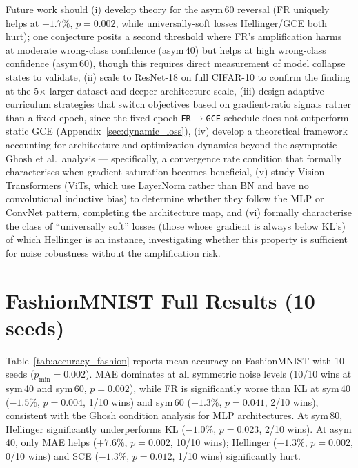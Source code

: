 \documentclass[11pt]{article}
\begin{document}
Future work should (i) develop theory for the asym\,60 reversal (FR uniquely helps
at $+1.7\%$, $p=0.002$, while universally-soft losses Hellinger/GCE both hurt);
one conjecture posits a second threshold where FR's amplification harms at moderate
wrong-class confidence (asym\,40) but helps at high wrong-class confidence (asym\,60),
though this requires direct measurement of model collapse states to validate,
(ii) scale to ResNet-18 on full CIFAR-10 to confirm the finding at the 5$\times$ larger
dataset and deeper architecture scale,
(iii) design adaptive curriculum strategies that switch objectives based on
gradient-ratio signals rather than a fixed epoch, since the fixed-epoch
\texttt{FR$\to$GCE} schedule does not outperform static GCE
(Appendix~\ref{sec:dynamic_loss}),
(iv) develop a theoretical framework accounting for architecture and optimization
dynamics beyond the asymptotic Ghosh et al.\ analysis — specifically, a convergence
rate condition that formally characterises when gradient saturation becomes beneficial,
(v) study Vision Transformers (ViTs, which use LayerNorm rather than BN and have
no convolutional inductive bias) to determine whether they follow the MLP or ConvNet
pattern, completing the architecture map, and
(vi) formally characterise the class of ``universally soft'' losses (those whose gradient
is always below KL's) of which Hellinger is an instance, investigating whether this
property is sufficient for noise robustness without the amplification risk.




\appendix

\section{FashionMNIST Full Results (10 seeds)}
\label{sec:fashion_mnist}

Table~\ref{tab:accuracy_fashion} reports mean accuracy on FashionMNIST with 10 seeds
($p_{\min}=0.002$).
MAE dominates at all symmetric noise levels (10/10 wins at sym\,40 and sym\,60, $p=0.002$),
while FR is significantly worse than KL at sym\,40 ($-1.5\%$, $p=0.004$, 1/10 wins) and
sym\,60 ($-1.3\%$, $p=0.041$, 2/10 wins), consistent with the Ghosh condition analysis
for MLP architectures.
At sym\,80, Hellinger significantly underperforms KL ($-1.0\%$, $p=0.023$, 2/10 wins).
At asym\,40, only MAE helps ($+7.6\%$, $p=0.002$, 10/10 wins); Hellinger ($-1.3\%$,
$p=0.002$, 0/10 wins) and SCE ($-1.3\%$, $p=0.012$, 1/10 wins) significantly hurt.
\end{document}
